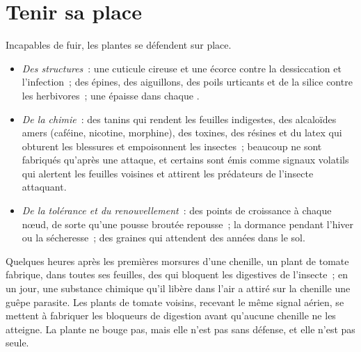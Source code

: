 \section{Tenir sa place}

\begin{proposition}\label{prop:g12:plant-rooted-life:defences}
Incapables de fuir, les plantes se défendent sur place.
\begin{itemize}
  \item \emph{Des structures}~: une cuticule cireuse et une écorce
        contre la dessiccation et l'infection~; des épines, des
        aiguillons, des poils urticants et de la silice contre les
        herbivores~; une épaisse  dans chaque
        .
  \item \emph{De la chimie}~: des tanins qui rendent les feuilles
        indigestes, des alcaloïdes amers (caféine, nicotine,
        morphine), des toxines, des résines et du latex qui obturent
        les blessures et empoisonnent les insectes~; beaucoup ne sont
        fabriqués qu'après une attaque, et certains sont émis comme
        signaux volatils qui alertent les feuilles voisines et
        attirent les prédateurs de l'insecte attaquant.
  \item \emph{De la tolérance et du renouvellement}~: des points de
        croissance à chaque nœud, de sorte qu'une pousse broutée
        repousse~; la dormance pendant l'hiver ou la sécheresse~; des
        graines qui attendent des années dans le sol.
\end{itemize}
\end{proposition}
\admitted

\begin{example}\label{ex:g12:plant-rooted-life:caterpillar}
Quelques heures après les premières morsures d'une chenille, un plant
de tomate fabrique, dans toutes ses feuilles, des  qui
bloquent les  digestives de l'insecte~; en un jour, une
substance chimique qu'il libère dans l'air a attiré sur la chenille
une guêpe parasite. Les plants de tomate voisins, recevant le même
signal aérien, se mettent à fabriquer les bloqueurs de digestion avant
qu'aucune chenille ne les atteigne. La plante ne bouge pas, mais elle
n'est pas sans défense, et elle n'est pas seule.
\end{example}

